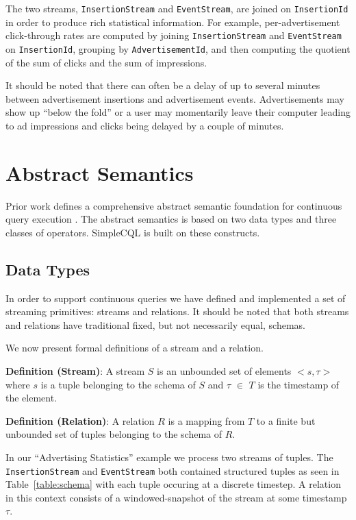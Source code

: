 \documentclass[a4paper, 10pt, conference]{IEEEconf}
\begin{document}
The two streams, \texttt{InsertionStream} and \texttt{EventStream}, are joined on \texttt{InsertionId} in order to produce rich statistical information.  For example, per-advertisement click-through rates are computed by joining \texttt{InsertionStream} and \texttt{EventStream} on \texttt{InsertionId}, grouping by \texttt{AdvertisementId}, and then computing the quotient of the sum of clicks and the sum of impressions.

It should be noted that there can often be a delay of up to several minutes between advertisement insertions and advertisement events.  Advertisements may show up ``below the fold'' or a user may momentarily leave their computer leading to ad impressions and clicks being delayed by a couple of minutes.

\section{Abstract Semantics}
Prior work defines a comprehensive abstract semantic foundation for continuous query execution \cite{cql}.  The abstract semantics is based on two data types and three classes of operators.  SimpleCQL is built on these constructs.

\subsection{Data Types}
In order to support continuous queries we have defined and implemented a set of streaming primitives: streams and relations. It should be noted that both streams and relations have traditional fixed, but not necessarily equal, schemas.

We now present formal definitions of a stream and a relation.

\textbf{Definition (Stream)}: A stream $S$ is an unbounded set of elements $<s, \tau>$ where $s$ is a tuple belonging to the schema of $S$ and $\tau$ $\in$ $T$ is the timestamp of the element.

\textbf{Definition (Relation)}:  A relation $R$ is a mapping from $T$ to a finite but unbounded set of tuples belonging to the schema of $R$.

In our ``Advertising Statistics'' example we process two streams of tuples.  The \texttt{InsertionStream} and \texttt{EventStream} both contained structured tuples as seen in Table~\ref{table:schema} with each tuple occuring at a discrete timestep.  A relation in this context consists of a windowed-snapshot of the stream at some timestamp $\tau$.
\end{document}
